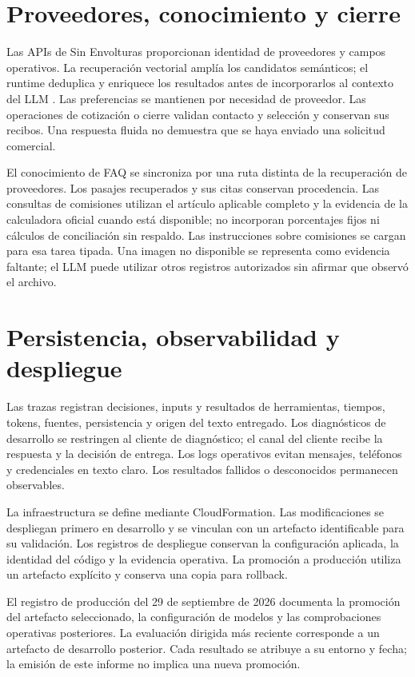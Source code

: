 \documentclass[
	a4paper,
	12pt,
]{CSSullivanBusinessReport}
\begin{document}
\section{Proveedores, conocimiento y cierre}
Las APIs de Sin Envolturas proporcionan identidad de proveedores y campos operativos. La recuperación vectorial amplía los candidatos semánticos; el runtime deduplica y enriquece los resultados antes de incorporarlos al contexto del LLM \cite{openai-retrieval}. Las preferencias se mantienen por necesidad de proveedor. Las operaciones de cotización o cierre validan contacto y selección y conservan sus recibos. Una respuesta fluida no demuestra que se haya enviado una solicitud comercial.

El conocimiento de FAQ se sincroniza por una ruta distinta de la recuperación de proveedores. Los pasajes recuperados y sus citas conservan procedencia. Las consultas de comisiones utilizan el artículo aplicable completo y la evidencia de la calculadora oficial cuando está disponible; no incorporan porcentajes fijos ni cálculos de conciliación sin respaldo. Las instrucciones sobre comisiones se cargan para esa tarea tipada. Una imagen no disponible se representa como evidencia faltante; el LLM puede utilizar otros registros autorizados sin afirmar que observó el archivo.

\section{Persistencia, observabilidad y despliegue}
Las trazas registran decisiones, inputs y resultados de herramientas, tiempos, tokens, fuentes, persistencia y origen del texto entregado. Los diagnósticos de desarrollo se restringen al cliente de diagnóstico; el canal del cliente recibe la respuesta y la decisión de entrega. Los logs operativos evitan mensajes, teléfonos y credenciales en texto claro. Los resultados fallidos o desconocidos permanecen observables.

La infraestructura se define mediante CloudFormation. Las modificaciones se despliegan primero en desarrollo y se vinculan con un artefacto identificable para su validación. Los registros de despliegue conservan la configuración aplicada, la identidad del código y la evidencia operativa. La promoción a producción utiliza un artefacto explícito y conserva una copia para rollback.

El registro de producción del 29 de septiembre de 2026 documenta la promoción del artefacto seleccionado, la configuración de modelos y las comprobaciones operativas posteriores. La evaluación dirigida más reciente corresponde a un artefacto de desarrollo posterior. Cada resultado se atribuye a su entorno y fecha; la emisión de este informe no implica una nueva promoción.
\end{document}

